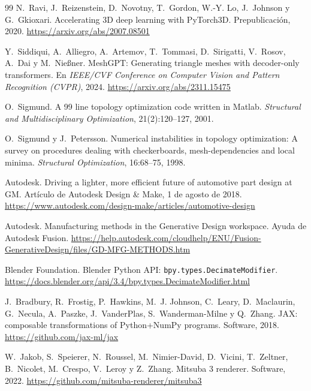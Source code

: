 \begin{thebibliography}{99}
N.~Ravi, J.~Reizenstein, D.~Novotny, T.~Gordon, W.-Y. Lo, J.~Johnson y G.~Gkioxari.
\newblock Accelerating 3D deep learning with PyTorch3D.
\newblock Prepublicación, 2020.
\newblock \url{https://arxiv.org/abs/2007.08501}

Y.~Siddiqui, A.~Alliegro, A.~Artemov, T.~Tommasi, D.~Sirigatti, V.~Rosov, A.~Dai y M.~Nießner.
\newblock MeshGPT: Generating triangle meshes with decoder-only transformers.
\newblock En \emph{IEEE/CVF Conference on Computer Vision and Pattern Recognition (CVPR)}, 2024.
\newblock \url{https://arxiv.org/abs/2311.15475}

O.~Sigmund.
\newblock A 99 line topology optimization code written in Matlab.
\newblock \emph{Structural and Multidisciplinary Optimization}, 21(2):120--127, 2001.

O.~Sigmund y J.~Petersson.
\newblock Numerical instabilities in topology optimization: A survey on procedures dealing with checkerboards, mesh-dependencies and local minima.
\newblock \emph{Structural Optimization}, 16:68--75, 1998.

Autodesk.
\newblock Driving a lighter, more efficient future of automotive part design at GM.
\newblock Artículo de Autodesk Design \& Make, 1 de agosto de 2018.
\newblock \url{https://www.autodesk.com/design-make/articles/automotive-design}

Autodesk.
\newblock Manufacturing methods in the Generative Design workspace. Ayuda de Autodesk Fusion.
\newblock \url{https://help.autodesk.com/cloudhelp/ENU/Fusion-GenerativeDesign/files/GD-MFG-METHODS.htm}

Blender Foundation.
\newblock Blender Python API: \texttt{bpy.types.DecimateModifier}.
\newblock \url{https://docs.blender.org/api/3.4/bpy.types.DecimateModifier.html}

J.~Bradbury, R.~Frostig, P.~Hawkins, M.~J. Johnson, C.~Leary, D.~Maclaurin, G.~Necula, A.~Paszke, J.~VanderPlas, S.~Wanderman-Milne y Q.~Zhang.
\newblock JAX: composable transformations of Python+NumPy programs.
\newblock Software, 2018.
\newblock \url{https://github.com/jax-ml/jax}

W.~Jakob, S.~Speierer, N.~Roussel, M.~Nimier-David, D.~Vicini, T.~Zeltner, B.~Nicolet, M.~Crespo, V.~Leroy y Z.~Zhang.
\newblock Mitsuba 3 renderer.
\newblock Software, 2022.
\newblock \url{https://github.com/mitsuba-renderer/mitsuba3}


\end{thebibliography}
